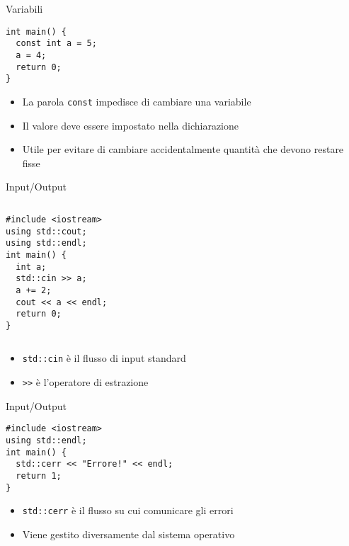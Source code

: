 \documentclass[xcolor=dvipsnames,handout]{beamer}
\begin{document}
\begin{frame}[fragile]{Variabili}
  \vfill
  \begin{lstlisting}
int main() {
  const int a = 5;
  a = 4;
  return 0;
}
  \end{lstlisting}
  \vfill
  \begin{itemize}
    \item La parola \lstinline$const$ impedisce di cambiare una variabile
    \vfill
    \item Il valore deve essere impostato nella dichiarazione
    \vfill
    \item Utile per evitare di cambiare accidentalmente quantità che devono restare fisse
  \end{itemize}
  \vfill
\end{frame}

\begin{frame}[fragile]{Input/Output}
  \vfill
  \begin{columns}[c]
    \vfill
    \begin{lstlisting}
#include <iostream>
using std::cout;
using std::endl;
int main() {
  int a;
  std::cin >> a;
  a += 2;
  cout << a << endl;
  return 0;
}
    \end{lstlisting}
    \vfill
    \vfill
    \begin{center}\end{center}
    \vfill
  \end{columns}
  \vfill
  \begin{itemize}
    \item \lstinline$std::cin$ è il flusso di input standard
    \vfill
    \item \lstinline$>>$ è l'operatore di \alert{estrazione}
  \end{itemize}
  \vfill
\end{frame}

\begin{frame}[fragile]{Input/Output}
  \vfill
  \begin{lstlisting}
#include <iostream>
using std::endl;
int main() {
  std::cerr << "Errore!" << endl;
  return 1;
}
  \end{lstlisting}
  \vfill
  \begin{itemize}
    \item \lstinline$std::cerr$ è il flusso su cui comunicare gli errori
    \vfill
    \item Viene gestito diversamente dal sistema operativo
  \end{itemize}
  \vfill
\end{frame}
\end{document}
